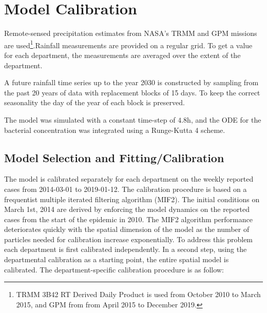 \section{Model Calibration}
Remote-sensed precipitation estimates from NASA's TRMM and GPM missions are used\footnote{TRMM 3B42 RT Derived Daily Product \parencite{Huffman:TRMMMultisatellitePrecipitation:2007} is used from October 2010 to March 2015,  and GPM from from April 2015 to December 2019.}.Rainfall measurements are provided on a regular grid. To get a value for each department, the measurements are averaged over the extent of the department.

A future rainfall time series up to the year 2030 is constructed by sampling from the past 20 years of data  with replacement blocks of 15 days. To keep the correct seasonality the day of the year of each block is preserved.

The model was simulated with a constant time-step of $4.8$h, and the ODE for the bacterial concentration was integrated using a Runge-Kutta 4 scheme.


\subsection{Model Selection and Fitting/Calibration}



The model is calibrated separately for each department on the weekly reported cases from 2014-03-01 to 2019-01-12. The calibration procedure is based on a frequentist multiple iterated filtering algorithm (MIF2)\cite{Ionides:InferenceDynamicLatent:2015}. The initial conditions on March 1st, 2014 are derived by enforcing the model dynamics on the reported cases from the start of the epidemic in 2010. The MIF2 algorithm performance deteriorates quickly with the spatial dimension of the model as the number of particles needed for calibration increase exponentially\cite{Park:GuidedIntermediateResampling:2017}. To address this problem each department is first calibrated independently. In a second step, using the departmental calibration as a starting point, the entire spatial model is calibrated.
The department-specific calibration procedure is as follow:

